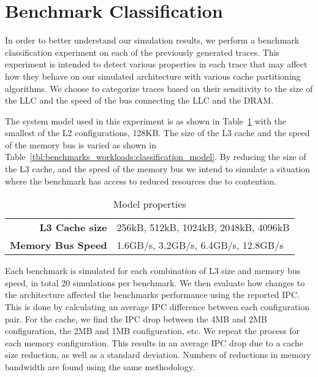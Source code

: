 \section{Benchmark Classification}

In order to better understand our simulation results, we perform a benchmark classification experiment on each of the previously generated traces.
This experiment is intended to detect various properties in each trace that may affect how they behave on our simulated architecture with various cache partitioning algorithms.
We choose to categorize traces based on their sensitivity to the size of the LLC and the speed of the bus connecting the LLC and the DRAM.

The system model used in this experiment is as shown in Table~\ref{tbl:processor_model:properties} with the smallest of the L2 configurations, 128KB.
The size of the L3 cache and the speed of the memory bus is varied as shown in Table~\ref{tbl:benchmarks_workloads:classification_model}.
By reducing the size of the L3 cache, and the speed of the memory bus we intend to simulate a situation where the benchmark has access to reduced resources due to contention. 

\begin{table}[ht]
\centering
\begin{tabular}{rl}
\toprule
\bf{L3 Cache size} & 256kB, 512kB, 1024kB, 2048kB, 4096kB \\
\bf{Memory Bus Speed}   & 1.6GB/s, 3.2GB/s, 6.4GB/s, 12.8GB/s \\
\bottomrule                             
\end{tabular}
\caption{Model properties}
\label{tbl:processor_model:properties}
\end{table}

Each benchmark is simulated for each combination of L3 size and memory bus speed, in total 20 simulations per benchmark.
We then evaluate how changes to the architecture affected the benchmarks performance using the reported IPC.
This is done by calculating an average IPC difference between each configuration pair.
For the cache, we find the IPC drop between the 4MB and 2MB configuration, the 2MB and 1MB configuration, etc.
We repeat the process for each memory configuration.
This results in an average IPC drop due to a cache size reduction, as well as a standard deviation.
Numbers of reductions in memory bandwidth are found using the same methodology.

